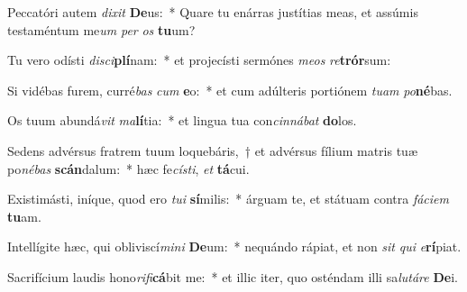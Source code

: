 \item Peccatóri autem \textit{di}\textit{xit} \textbf{De}us:~* Quare tu enárras justítias meas, et assúmis testaméntum me\textit{um} \textit{per} \textit{os} \textbf{tu}um?
\item Tu vero odísti \textit{di}\textit{sci}\textbf{plí}nam:~* et projecísti sermónes \textit{me}\textit{os} \textit{re}\textbf{trór}sum:
\item Si vidébas furem, curré\textit{bas} \textit{cum} \textbf{e}o:~* et cum adúlteris portiónem \textit{tu}\textit{am} \textit{po}\textbf{né}bas.
\item Os tuum abundá\textit{vit} \textit{ma}\textbf{lí}tia:~* et lingua tua con\textit{cin}\textit{ná}\textit{bat} \textbf{do}los.
\item Sedens advérsus fratrem tuum loquebáris,~† et advérsus fílium matris tuæ po\textit{né}\textit{bas} \textbf{scán}dalum:~* hæc fe\textit{cís}\textit{ti}, \textit{et} \textbf{tá}cui.
\item Existimásti, iníque, quod ero \textit{tu}\textit{i} \textbf{sí}milis:~* árguam te, et státuam contra \textit{fá}\textit{ci}\textit{em} \textbf{tu}am.
\item Intellígite hæc, qui obliviscí\textit{mi}\textit{ni} \textbf{De}um:~* nequándo rápiat, et non \textit{sit} \textit{qui} \textit{e}\textbf{rí}piat.
\item Sacrifícium laudis hono\textit{ri}\textit{fi}\textbf{cá}bit me:~* et illic iter, quo osténdam illi sa\textit{lu}\textit{tá}\textit{re} \textbf{De}i.
